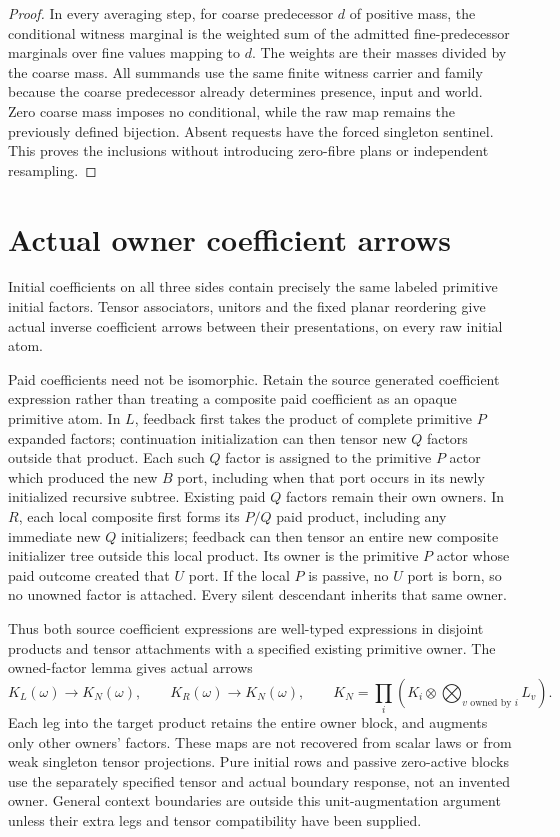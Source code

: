 \documentclass[11pt]{article}\usepackage{amsmath,amssymb,amsthm,geometry}\geometry{margin=1in}
\begin{document}
\begin{proof}
In every averaging step, for coarse predecessor $d$ of positive mass, the conditional witness marginal is the weighted sum of the admitted fine-predecessor marginals over fine values mapping to $d$. The weights are their masses divided by the coarse mass. All summands use the same finite witness carrier and family because the coarse predecessor already determines presence, input and world. Zero coarse mass imposes no conditional, while the raw map remains the previously defined bijection. Absent requests have the forced singleton sentinel. This proves the inclusions without introducing zero-fibre plans or independent resampling.
\end{proof}

\section{Actual owner coefficient arrows}
Initial coefficients on all three sides contain precisely the same labeled primitive initial factors. Tensor associators, unitors and the fixed planar reordering give actual inverse coefficient arrows between their presentations, on every raw initial atom.

Paid coefficients need not be isomorphic. Retain the source generated coefficient expression rather than treating a composite paid coefficient as an opaque primitive atom. In $L$, feedback first takes the product of complete primitive $P$ expanded factors; continuation initialization can then tensor new $Q$ factors outside that product. Each such $Q$ factor is assigned to the primitive $P$ actor which produced the new $B$ port, including when that port occurs in its newly initialized recursive subtree. Existing paid $Q$ factors remain their own owners. In $R$, each local composite first forms its $P/Q$ paid product, including any immediate new $Q$ initializers; feedback can then tensor an entire new composite initializer tree outside this local product. Its owner is the primitive $P$ actor whose paid outcome created that $U$ port. If the local $P$ is passive, no $U$ port is born, so no unowned factor is attached. Every silent descendant inherits that same owner.

Thus both source coefficient expressions are well-typed expressions in disjoint products and tensor attachments with a specified existing primitive owner. The owned-factor lemma gives actual arrows
\[
 K_L(\omega)\longrightarrow K_N(\omega),\qquad
 K_R(\omega)\longrightarrow K_N(\omega),\qquad
 K_N=\prod_i\left(K_i\otimes\bigotimes_{v\text{ owned by }i}L_v\right).
\]
Each leg into the target product retains the entire owner block, and augments only other owners' factors. These maps are not recovered from scalar laws or from weak singleton tensor projections. Pure initial rows and passive zero-active blocks use the separately specified tensor and actual boundary response, not an invented owner. General context boundaries are outside this unit-augmentation argument unless their extra legs and tensor compatibility have been supplied.
\end{document}
